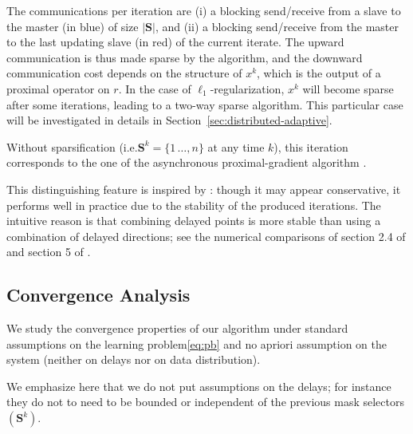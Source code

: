 The communications per iteration are (i) a blocking {\color{blue!70!black}send/receive} from a slave to the master (in {\color{blue!70!black}blue}) of size $|\mathbf{S}|$, and (ii) a blocking {\color{red!80!yellow}send/receive} from the master to the last updating slave (in {\color{red!80!yellow}red}) of the current iterate.
The upward communication is thus made sparse by the algorithm, and the downward communication cost depends on the structure of $x^k$, which is the output of a proximal operator on $r$. In the case of $\ell_1$-regularization, $x^k$ will become sparse after some iterations, leading to a two-way sparse algorithm. This particular case will be investigated in details in Section~\ref{sec:distributed-adaptive}. 



Without sparsification (i.e.\;$\mathbf{S}^{k}= \{1\,\ldots,n\}$ at any time $k$), this iteration corresponds to the one of the asynchronous proximal-gradient algorithm \dave \cite{ICML18}.


This distinguishing feature is inspired by \dave \cite{mishchenko2018}: though it may appear conservative, it performs well in practice due to the stability of the produced iterations. The intuitive reason is that combining delayed points is more stable than using a combination of delayed directions; see the numerical comparisons of section 2.4 of \cite{mishchenko2018} and section 5 of \cite{ICML18}. 



\subsection{Convergence Analysis}\label{sec:analyze}

We study the convergence properties of our algorithm under standard assumptions on the learning problem\;\eqref{eq:pb} and no apriori assumption on the system (neither on delays nor on data distribution).






We emphasize here that we do not put assumptions on the delays; for instance they do not to need to be bounded or independent of the previous mask selectors $(\mathbf{S}^k)$. 

